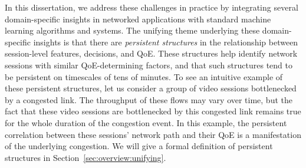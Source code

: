 In this dissertation, we address these challenges in practice by integrating 
several domain-specific insights in networked applications with 
standard machine learning algorithms and systems. 
The unifying theme underlying these domain-specific insights is 
that there are {\em persistent structures} in the relationship
between session-level features, decisions, and QoE.
These structures help identify network sessions with similar 
QoE-determining factors, and that such structures tend to be 
persistent on timescales of tens of minutes.
To see an intuitive example of these persistent structures, let us consider 
a group of video sessions bottlenecked by a congested link.
The throughput of these flows may vary over time, but the fact
that these video sessions are bottlenecked by this congested link remains true 
for the whole duration of the congestion event.
In this example,  the persistent correlation between these sessions' 
network path and their QoE is a manifestation of the underlying congestion.
We will give a formal definition of persistent structures in
Section~\ref{sec:overview:unifying}.



